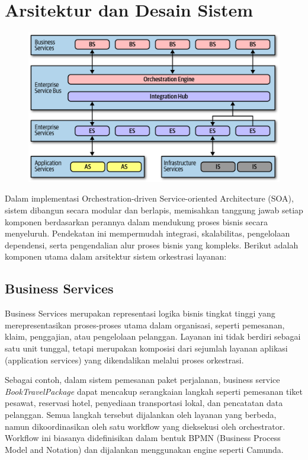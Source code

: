 \section{Arsitektur dan Desain Sistem}

\begin{figure}
	\centering
	\includegraphics[width=\textwidth]{../images/orchestration-example}
\end{figure}
Dalam implementasi Orchestration-driven Service-oriented Architecture (SOA), sistem dibangun secara modular dan berlapis, memisahkan tanggung jawab setiap komponen berdasarkan perannya dalam mendukung proses bisnis secara menyeluruh. Pendekatan ini mempermudah integrasi, skalabilitas, pengelolaan dependensi, serta pengendalian alur proses bisnis yang kompleks. Berikut adalah komponen utama dalam arsitektur sistem orkestrasi layanan:

\subsection{Business Services}
Business Services merupakan representasi logika bisnis tingkat tinggi yang merepresentasikan proses-proses utama dalam organisasi, seperti pemesanan, klaim, penggajian, atau pengelolaan pelanggan. Layanan ini tidak berdiri sebagai satu unit tunggal, tetapi merupakan komposisi dari sejumlah layanan aplikasi (application services) yang dikendalikan melalui proses orkestrasi.

Sebagai contoh, dalam sistem pemesanan paket perjalanan, business service \textit{BookTravelPackage} dapat mencakup serangkaian langkah seperti pemesanan tiket pesawat, reservasi hotel, penyediaan transportasi lokal, dan pencatatan data pelanggan. Semua langkah tersebut dijalankan oleh layanan yang berbeda, namun dikoordinasikan oleh satu workflow yang dieksekusi oleh orchestrator. Workflow ini biasanya didefinisikan dalam bentuk BPMN (Business Process Model and Notation) dan dijalankan menggunakan engine seperti Camunda.

